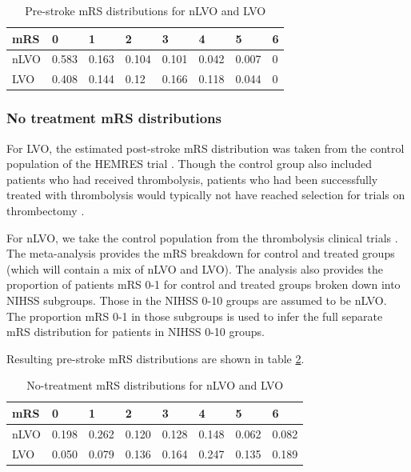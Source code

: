 \begin{table}
\caption{Pre-stroke mRS distributions for nLVO and LVO}\label{tab:pre_stroke}
\centering

\begin{tabular}{l | l l l l l l l}
mRS & 0 & 1 & 2 & 3 & 4 & 5 & 6 \\
\hline
nLVO & 0.583 & 0.163 & 0.104 & 0.101 & 0.042 & 0.007 & 0 \\
LVO & 0.408 & 0.144 & 0.12 & 0.166 & 0.118 & 0.044 & 0 \\
\end{tabular}
\end{table}

\subsubsection{No treatment mRS distributions}

For LVO, the estimated post-stroke mRS distribution was taken from the control population of the HEMRES trial \cite{goyal_endovascular_2016}. Though the control group also included patients who had received thrombolysis, patients who had been successfully treated with thrombolysis would typically not have reached selection for trials on thrombectomy \cite{tsivgoulis_successful_2018}.


For nLVO, we take the control population from the thrombolysis clinical trials \cite{emberson_effect_2014}. The meta-analysis provides the mRS breakdown for control and treated groups (which will contain a mix of nLVO and LVO). The analysis also provides the proportion of patients mRS 0-1 for control and treated groups broken down into NIHSS subgroups. Those in the NIHSS 0-10 groups are assumed to be nLVO. The proportion mRS 0-1 in those subgroups is used to infer the full separate mRS distribution for patients in NIHSS 0-10 groups. 

Resulting pre-stroke mRS distributions are shown in table \ref{tab:no_treatment}. 

\begin{table}
\caption{No-treatment mRS distributions for nLVO and LVO}\label{tab:no_treatment}
\centering
\begin{tabular}{l | l l l l l l l}
mRS & 0 & 1 & 2 & 3 & 4 & 5 & 6 \\
\hline
nLVO & 0.198 & 0.262 & 0.120 & 0.128 & 0.148 & 0.062 & 0.082 \\
LVO & 0.050 & 0.079 & 0.136 & 0.164 & 0.247 & 0.135 & 0.189 \\
\end{tabular}
\end{table}


